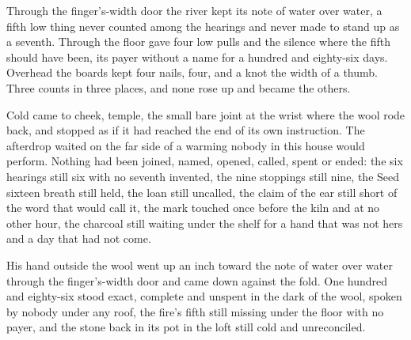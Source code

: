 Through the finger's-width door the river kept its note of water over water, a fifth low thing never counted among the hearings and never made to stand up as a seventh. Through the floor  gave four low pulls and the silence where the fifth should have been, its payer without a name for a hundred and eighty-six days. Overhead the boards kept four nails, four, and a knot the width of a thumb. Three counts in three places, and none rose up and became the others.

Cold came to cheek, temple, the small bare joint at the wrist where the wool rode back, and stopped as if it had reached the end of its own instruction. The afterdrop waited on the far side of a warming nobody in this house would perform. Nothing had been joined, named, opened, called, spent or ended: the six hearings still six with no seventh invented, the nine stoppings still nine, the Seed sixteen breath still held, the loan still uncalled, the claim of the ear still short of the word that would call it, the mark touched once before the kiln and at no other hour, the charcoal still waiting under the shelf for a hand that was not hers and a day that had not come.

His hand outside the wool went up an inch toward the note of water over water through the finger's-width door and came down against the fold. One hundred and eighty-six stood exact, complete and unspent in the dark of the wool, spoken by nobody under any roof, the fire's fifth still missing under the floor with no payer, and the stone back in its pot in the loft still cold and unreconciled.
